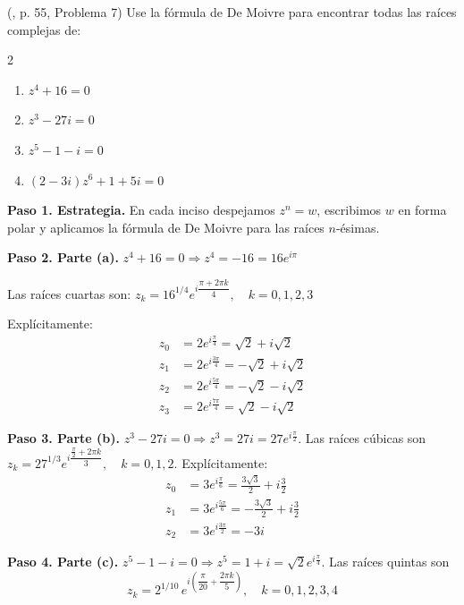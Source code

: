 \begin{prob}  (\cite{andreescu2014complex}, p. 55, Problema 7) Use la fórmula de De Moivre para encontrar todas las raíces complejas de:
\begin{multicols}{2}
\begin{enumerate}[$a)$]
\item $z^4+16=0$
\item $z^3-27i=0$
\item $z^5-1-i=0$
\item $(2-3i)z^6+1+5i=0$
\end{enumerate}
\end{multicols}
\begin{myproof}
\textbf{Paso 1. Estrategia.} En cada inciso despejamos $z^n=w$, escribimos $w$ en forma polar y aplicamos la fórmula de De Moivre para las raíces $n$-ésimas.

\textbf{Paso 2. Parte (a).} $z^4 + 16 = 0\Rightarrow z^4 = -16 = 16 e^{i\pi}$

Las raíces cuartas son: \(
z_k = 16^{1/4} e^{i \dfrac{\pi + 2\pi k}{4}}, \quad k = 0,1,2,3
\)

Explícitamente:
\[
\boxed{
\begin{aligned}
z_0 &= 2 e^{i\frac{\pi}{4}} = \sqrt{2} + i\sqrt{2} \\
z_1 &= 2 e^{i\frac{3\pi}{4}} = -\sqrt{2} + i\sqrt{2} \\
z_2 &= 2 e^{i\frac{5\pi}{4}} = -\sqrt{2} - i\sqrt{2} \\
z_3 &= 2 e^{i\frac{7\pi}{4}} = \sqrt{2} - i\sqrt{2}
\end{aligned}
}
\]

\vspace{1em}

\textbf{Paso 3. Parte (b).} $z^3 - 27i = 0 \Rightarrow z^3 = 27i = 27 e^{i\frac{\pi}{2}}.$
Las raíces cúbicas son \( z_k = 27^{1/3} e^{i \dfrac{\frac{\pi}{2} + 2\pi k}{3}}, \quad k=0,1,2.
\)
Explícitamente: 
\[
\boxed{
\begin{aligned}
z_0 &= 3 e^{i\frac{\pi}{6}} = \frac{3\sqrt{3}}{2} + i\frac{3}{2} \\
z_1 &= 3 e^{i\frac{5\pi}{6}} = -\frac{3\sqrt{3}}{2} + i\frac{3}{2} \\
z_2 &= 3 e^{i\frac{3\pi}{2}} = -3i
\end{aligned}
}
\]


\textbf{Paso 4. Parte (c).} $z^5 - 1 - i = 0\Rightarrow z^5 = 1 + i = \sqrt{2} e^{i\frac{\pi}{4}}.$ Las raíces quintas son 
\[
\boxed{
z_k = 2^{1/10} \, e^{i\left( \dfrac{\pi}{20} + \dfrac{2\pi k}{5} \right ) }, \quad k=0,1,2,3,4
}
\]



\end{myproof}
\end{prob}
